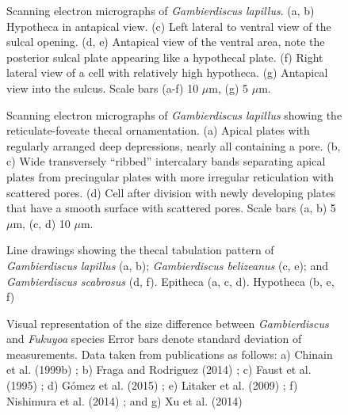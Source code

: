 \documentclass[12pt]{article}
\begin{document}
\FloatBarrier 
\begin{figure} 
\caption{Scanning electron micrographs of \textit{Gambierdiscus lapillus}. (a, b) Hypotheca in antapical view. (c) Left lateral to ventral view of the sulcal opening. (d, e) Antapical view of the ventral area, note the posterior sulcal plate appearing like a hypothecal plate. (f) Right lateral view of a cell with relatively high hypotheca. (g) Antapical view into the sulcus. Scale bars (a-f) 10 $\mu$m, (g) 5 $\mu$m.} 
\label{fig:hypoSEM}
\end{figure} 
\FloatBarrier

\FloatBarrier 
\begin{figure} 
\caption{Scanning electron micrographs of \textit{Gambierdiscus lapillus} showing the reticulate-foveate thecal ornamentation. (a) Apical plates with regularly arranged deep depressions, nearly all containing a pore. (b, c) Wide transversely “ribbed” intercalary bands separating apical plates from precingular plates with more irregular reticulation with scattered pores. (d) Cell after division with newly developing plates that have a smooth surface with scattered pores. Scale bars (a, b) 5 $\mu$m, (c, d) 10 $\mu$m.} 
\label{fig:ornSEM}
\end{figure} 
\FloatBarrier

\FloatBarrier 
\begin{figure} 
\caption{Line drawings showing the thecal tabulation pattern of \textit{Gambierdiscus lapillus} (a, b); \textit{Gambierdiscus belizeanus} (c, e); and \textit{Gambierdiscus scabrosus} (d, f). Epitheca (a, c, d). Hypotheca (b, e, f)} 
\label{fig:DrawMorph}
\end{figure}

\FloatBarrier 
\begin{figure} 
\caption{Visual representation of the size difference between \emph{Gambierdiscus} and \textit{Fukuyoa} species Error bars denote standard deviation of measurements. Data taken from publications as follows: a) Chinain et al. (1999b) \citep{chinain1999morphology}; b) Fraga and Rodriguez (2014) \citep{fraga2014genus}; c) Faust et al. (1995) \citep{faust1995observation}; d) G\'omez et al. (2015) \citep{gomez2015fukuyoa}; e) Litaker et al. (2009) \citep{litaker2009taxonomy}; f) Nishimura et al. (2014) \citep{nishimura2014morphology}; and g) Xu et al. (2014) \citep{xu2014distribution}} 
\label{fig:SizeGraph}
\end{figure} 
\end{document}
